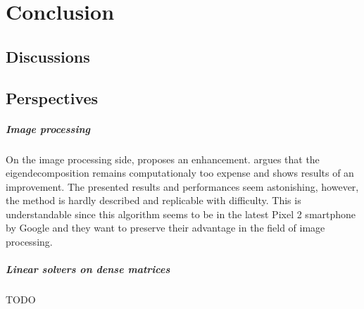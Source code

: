 \chapter{Conclusion}

\section{Discussions}
\paragraph{}

\section{Perspectives}

\paragraph{Image processing}
On the image processing side, \cite{talebi_fast_2016} proposes an enhancement.
\cite{talebi_fast_2016} argues that the eigendecomposition remains computationaly too expense and shows results of an improvement.
The presented results and performances seem astonishing, however, the method is hardly described and replicable with difficulty.
This is understandable since this algorithm seems to be in the latest Pixel 2 smartphone by Google and they want to preserve their advantage in the field of image processing.

\paragraph{Linear solvers on dense matrices}
TODO

